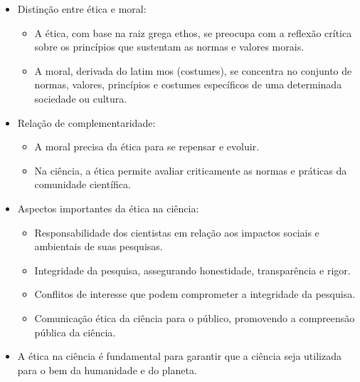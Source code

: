 \begin{itemize}
    \item Distinção entre ética e moral:
    \begin{itemize}
        \item A ética, com base na raiz grega ethos, se preocupa com a reflexão crítica sobre os princípios que sustentam as normas e valores morais.
        \item A moral, derivada do latim mos (costumes), se concentra no conjunto de normas, valores, princípios e costumes específicos de uma determinada sociedade ou cultura.
    \end{itemize}
    \item Relação de complementaridade:
    \begin{itemize}
        \item A moral precisa da ética para se repensar e evoluir.
        \item Na ciência, a ética permite avaliar criticamente as normas e práticas da comunidade científica.
    \end{itemize}
    \item Aspectos importantes da ética na ciência:
    \begin{itemize}
        \item Responsabilidade dos cientistas em relação aos impactos sociais e ambientais de suas pesquisas.
        \item Integridade da pesquisa, assegurando honestidade, transparência e rigor.
        \item Conflitos de interesse que podem comprometer a integridade da pesquisa.
        \item Comunicação ética da ciência para o público, promovendo a compreensão pública da ciência.
    \end{itemize}
    \item A ética na ciência é fundamental para garantir que a ciência seja utilizada para o bem da humanidade e do planeta.
\end{itemize}